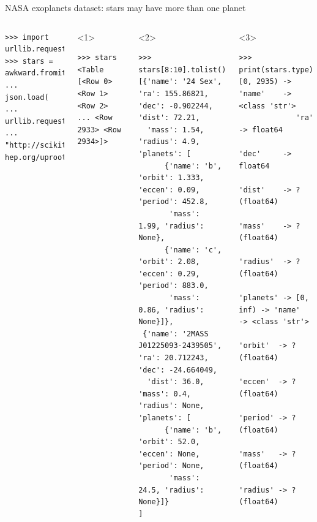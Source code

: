 \documentclass[aspectratio=169]{beamer}
\begin{document}
\begin{frame}[fragile]{NASA exoplanets dataset: stars may have more than one planet}
\begin{columns}
\small
\begin{verbatim}
>>> import urllib.request
>>> stars = awkward.fromiter(
...     json.load(
...         urllib.request.urlopen(
...            "http://scikit-hep.org/uproot/examples/exoplanets.json")))
\end{verbatim}

\begin{onlyenv}<1>
\begin{verbatim}
>>> stars
<Table [<Row 0> <Row 1> <Row 2> ... <Row 2933> <Row 2934>]>
\end{verbatim}

\vspace{10 cm}
\end{onlyenv}
\begin{onlyenv}<2>
\begin{verbatim}
>>> stars[8:10].tolist()
[{'name': '24 Sex', 'ra': 155.86821, 'dec': -0.902244, 'dist': 72.21,
  'mass': 1.54, 'radius': 4.9, 'planets': [
      {'name': 'b', 'orbit': 1.333, 'eccen': 0.09, 'period': 452.8,
       'mass': 1.99, 'radius': None},
      {'name': 'c', 'orbit': 2.08, 'eccen': 0.29, 'period': 883.0,
       'mass': 0.86, 'radius': None}]},
 {'name': '2MASS J01225093-2439505', 'ra': 20.712243, 'dec': -24.664049,
  'dist': 36.0, 'mass': 0.4, 'radius': None, 'planets': [
      {'name': 'b', 'orbit': 52.0, 'eccen': None, 'period': None,
       'mass': 24.5, 'radius': None}]}
]
\end{verbatim}

\vspace{10 cm}
\end{onlyenv}
\begin{onlyenv}<3>
\small
\vspace{-0.5 cm}
\begin{verbatim}
>>> print(stars.type)
[0, 2935) -> 'name'    -> <class 'str'>
             'ra'      -> float64
             'dec'     -> float64
             'dist'    -> ?(float64)
             'mass'    -> ?(float64)
             'radius'  -> ?(float64)
             'planets' -> [0, inf) -> 'name'   -> <class 'str'>
                                      'orbit'  -> ?(float64)
                                      'eccen'  -> ?(float64)
                                      'period' -> ?(float64)
                                      'mass'   -> ?(float64)
                                      'radius' -> ?(float64)
\end{verbatim}


\end{onlyenv}
\end{columns}
\end{frame}
\end{document}
